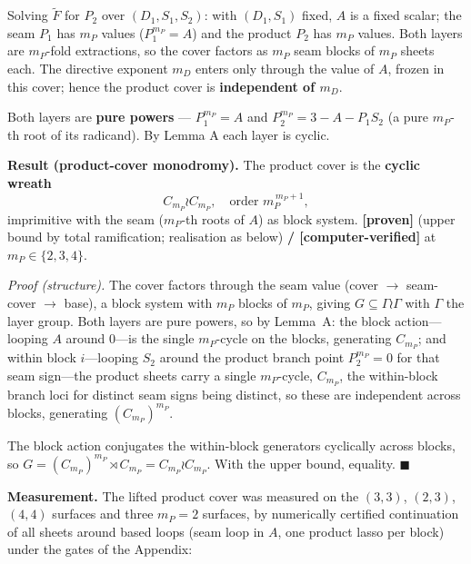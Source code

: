 \documentclass[11pt]{article}
\theoremstyle{plain}
\theoremstyle{definition}
\theoremstyle{remark}
\begin{document}
Solving \(\widetilde F\) for \(P_2\) over \((D_1,S_1,S_2)\): with \((D_1,S_1)\) fixed, \(A\) is a fixed scalar; the seam \(P_1\) has \(m_P\) values (\(P_1^{m_P} = A\)) and the product \(P_2\) has \(m_P\) values. Both layers are \(m_P\)-fold extractions, so the cover factors as \(m_P\) seam blocks of \(m_P\) sheets each. The directive exponent \(m_D\) enters only through the value of \(A\), frozen in this cover; hence the product cover is \textbf{independent of \(m_D\)}.

Both layers are \textbf{pure powers} --- \(P_1^{m_P} = A\) and \(P_2^{m_P} = 3 - A - P_1 S_2\) (a pure \(m_P\)-th root of its radicand). By Lemma A each layer is cyclic.

\textbf{Result (product-cover monodromy).} The product cover is the \textbf{cyclic wreath} \[
\boxed{\;C_{m_P}\wr C_{m_P}, \quad \text{order } m_P^{\,m_P+1},\;}
\] imprimitive with the seam (\(m_P\)-th roots of \(A\)) as block system. \textbf{{[}proven{]}} (upper bound by total ramification; realisation as below) \textbf{/ {[}computer-verified{]}} at \(m_P \in \{2,3,4\}\).

\emph{Proof (structure).} The cover factors through the seam value (cover \(\to\) seam-cover \(\to\) base), a block system with \(m_P\) blocks of \(m_P\), giving \(G \subseteq \Gamma\wr\Gamma\) with \(\Gamma\) the layer group. Both layers are pure powers, so by Lemma~A: the block action---looping \(A\) around \(0\)---is the single \(m_P\)-cycle on the blocks, generating \(C_{m_P}\); and within block \(i\)---looping \(S_2\) around the product branch point \(P_2^{m_P} = 0\) for that seam sign---the product sheets carry a single \(m_P\)-cycle, \(C_{m_P}\), the within-block branch loci for distinct seam signs being distinct, so these are independent across blocks, generating \((C_{m_P})^{m_P}\).

The block action conjugates the within-block generators cyclically across blocks, so \(G = (C_{m_P})^{m_P}\rtimes C_{m_P} = C_{m_P}\wr C_{m_P}\). With the upper bound, equality. \(\blacksquare\)

\textbf{Measurement.} The lifted product cover was measured on the \((3,3)\), \((2,3)\), \((4,4)\) surfaces and three \(m_P=2\) surfaces, by numerically certified continuation of all sheets around based loops (seam loop in \(A\), one product lasso per block) under the gates of the Appendix:
\end{document}
